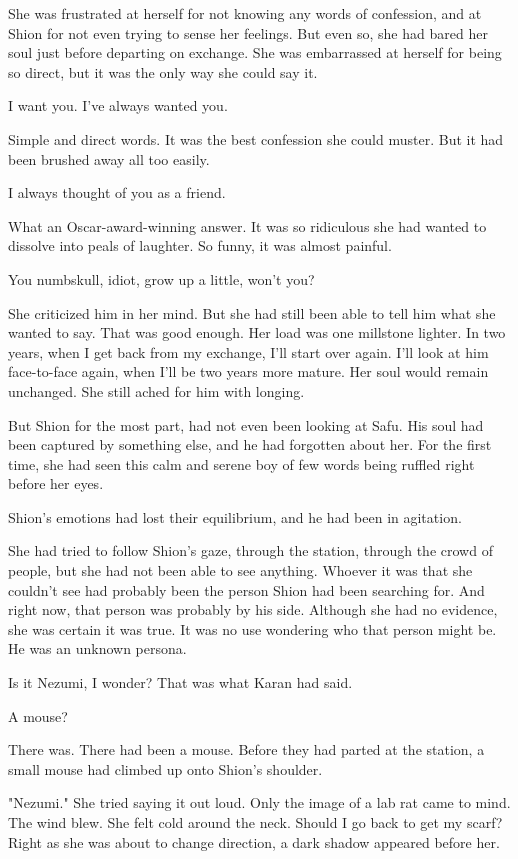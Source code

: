 She was frustrated at herself for not knowing any words of confession,
and at Shion for not even trying to sense her feelings. But even so, she
had bared her soul just before departing on exchange. She was
embarrassed at herself for being so direct, but it was the only way she
could say it.

I want you. I've always wanted you.

Simple and direct words. It was the best confession she could muster.
But it had been brushed away all too easily.

I always thought of you as a friend.

What an Oscar-award-winning answer. It was so ridiculous she had wanted
to dissolve into peals of laughter. So funny, it was almost painful.

You numbskull, idiot, grow up a little, won't you?

She criticized him in her mind. But she had still been able to tell him
what she wanted to say. That was good enough. Her load was one millstone
lighter. In two years, when I get back from my exchange, I'll start over
again. I'll look at him face-to-face again, when I'll be two years more
mature. Her soul would remain unchanged. She still ached for him with
longing.

But Shion for the most part, had not even been looking at Safu. His soul
had been captured by something else, and he had forgotten about her. For
the first time, she had seen this calm and serene boy of few words being
ruffled right before her eyes.

Shion's emotions had lost their equilibrium, and he had been in
agitation.

She had tried to follow Shion's gaze, through the station, through the
crowd of people, but she had not been able to see anything. Whoever it
was that she couldn't see had probably been the person Shion had been
searching for. And right now, that person was probably by his side.
Although she had no evidence, she was certain it was true. It was no use
wondering who that person might be. He was an unknown persona.

Is it Nezumi, I wonder? That was what Karan had said.

A mouse?

There was. There had been a mouse. Before they had parted at the
station, a small mouse had climbed up onto Shion's shoulder.

"Nezumi." She tried saying it out loud. Only the image of a lab rat came
to mind. The wind blew. She felt cold around the neck. Should I go back
to get my scarf? Right as she was about to change direction, a dark
shadow appeared before her.

